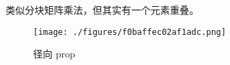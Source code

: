 
类似分块矩阵乘法，但其实有一个元素重叠。
\begin{figure}[ht]
\centering
\texttt{[image: ./figures/f0baffec02af1adc.png]}
\caption{径向 prop} \label{fig_HeMPI_1}
\end{figure}

